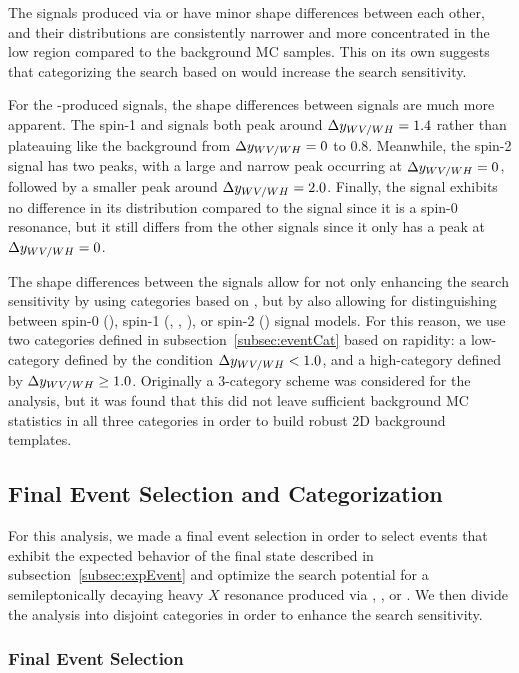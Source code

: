 The signals produced via \ggF or \DY have minor shape differences between each other, and their distributions are consistently narrower and more concentrated in the low \Dy region compared to the background MC samples.
This on its own suggests that categorizing the search based on \Dy would increase the search sensitivity.

For the \VBF-produced signals, the shape differences between signals are much more apparent.
The spin-1 \VBF\WprtoWZ and \ZprtoWW signals both peak around $\Delta y_{WV/WH}=1.4$ rather than plateauing like the background from $\Delta y_{WV/WH}=0$ to 0.8.
Meanwhile, the spin-2 \VBF\GBulktoWW signal has two peaks, with a large and narrow peak occurring at $\Delta y_{WV/WH}=0$, followed by a smaller peak around $\Delta y_{WV/WH}=2.0$.
Finally, the \VBF\RadtoWW signal exhibits no difference in its \Dy distribution compared to the \ggF\RadtoWW signal since it is a spin-0 resonance, but it still differs from the other \VBF signals since it only has a peak at $\Delta y_{WV/WH}=0$.

The shape differences between the \VBF signals allow for not only enhancing the search sensitivity by using categories based on \Dy, but by also allowing for distinguishing between spin-0 (\RadtoWW), spin-1 (\ZprtoWW, \WprtoWZ, \WprtoWH), or spin-2 (\GBulktoWW) \VBF signal models.
For this reason, we use two categories defined in subsection~\ref{subsec:eventCat} based on rapidity: a low-\Dy category defined by the condition $\Delta y_{WV/WH}<1.0$, and a high-\Dy category defined by $\Delta y_{WV/WH}\geq1.0$.
Originally a 3-category scheme was considered for the analysis, but it was found that this did not leave sufficient background MC statistics in all three categories in order to build robust 2D background templates.

\subsection{Final Event Selection and Categorization}
\label{subsec:eventSelect}

For this analysis, we made a final event selection in order to select events that exhibit the expected behavior of the final state described in subsection~\ref{subsec:expEvent} and optimize the search potential for a semileptonically decaying heavy $X$ resonance produced via \ggF, \DY, or \VBF.
We then divide the analysis into disjoint categories in order to enhance the search sensitivity.

\subsubsection{Final Event Selection}

